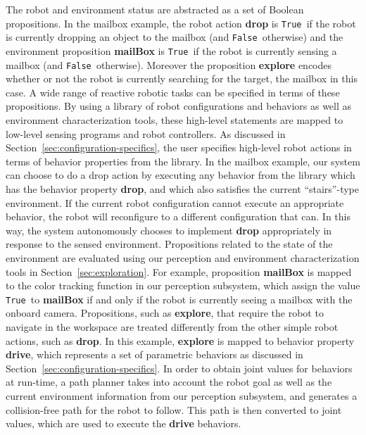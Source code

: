 \documentclass[journal]{IEEEtran}
\newcommand{\lt}{{\tt True }}
\newcommand{\lf}{{\tt False }}
\begin{document}
The robot and environment status are abstracted as a set of Boolean propositions.
In the mailbox example, the robot action \textbf{drop} is \lt if the robot is currently dropping an object to the mailbox (and \lf otherwise) and the environment proposition \textbf{mailBox} is \lt if the robot is currently sensing a mailbox (and \lf otherwise).
Moreover the proposition \textbf{explore} encodes whether or not the robot is currently searching for the target, the mailbox in this case.
A wide range of reactive robotic tasks can be specified in terms of these propositions.
By using a library of robot configurations and behaviors as well as environment characterization tools, these high-level statements are mapped to low-level sensing programs and robot controllers.
As discussed in Section~\ref{sec:configuration-specifics}, the user specifies high-level robot actions in terms of behavior properties from the library. In the mailbox example, our system can choose to do a drop action by executing any behavior from the library which has the behavior property \textbf{drop}, and which also satisfies the current ``stairs''-type environment. If the current robot configuration cannot execute an appropriate behavior, the robot will reconfigure to a different configuration that can.  In this way, the system autonomously chooses to implement  \textbf{drop}  appropriately in response to the sensed environment.
Propositions related to the state of the environment are evaluated using our perception and environment characterization tools in Section~\ref{sec:exploration}. For example, proposition \textbf{mailBox} is mapped to the color tracking function in our perception subsystem, which assign the value \lt to \textbf{mailBox} if and only if the robot is currently seeing a mailbox with the onboard camera.
Propositions, such as \textbf{explore}, that require the robot to navigate in the workspace are treated differently from the other simple robot actions, such as \textbf{drop}.
In this example, \textbf{explore} is mapped to behavior property \textbf{drive}, which represents a set of parametric behaviors as discussed in Section~\ref{sec:configuration-specifics}.
In order to obtain joint values for behaviors at run-time, a path planner takes into account the robot goal as well as the current environment information from  our perception subsystem, and generates a collision-free path for the robot to follow.
This path is then converted to joint values, which are used to execute the \textbf{drive} behaviors.
\end{document}

